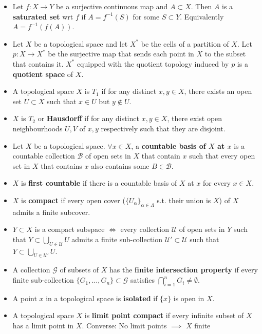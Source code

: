 \documentclass[frenchspacing,9pt,landscape,a4paper]{article}
\theoremstyle{remark}
\begin{document}
\begin{multicols}{4}
\begin{itemize}
\item Let $f:X\to Y$ be a surjective continuous map and  $A\subset X$. Then  $A$ is a \textbf{saturated set}
    wrt  $f$ if  $A=f^{-1}(S)$ for some  $S\subset Y$. Equivalently  $A=f^{-1}(f(A))$.
\item Let $X$ be a topological space and let  $X^*$ be the cells of a partition of  $X$. Let  $p:X\to X^*$ be
    the surjective map that sends each point in  $X$ to the subset that contains it.  $X^*$ equipped
    with the quotient topology induced by  $p$ is a \textbf{quotient space} of $X$.
    \item A topological space $X$ is  $T_1$ if for any distinct $x,y\in X$, there exists an open set  $U\subset X$ such
             that  $x\in U$ but  $y\notin U$.
         \item  $X$ is  $T_2$ or \textbf{Hausdorff} if for any distinct $x,y\in X$, there exist open
             neighbourhoods  $U,V$ of  $x,y$ respectively such that they are disjoint.
         \item  Let $X$ be a topological space. $\forall x\in X$, a \textbf{countable basis of $X$ at  $x$} is a countable collection
             $\mathcal{B}$ of open sets in  $X$ that contain  $x$ such that every open set in  $X$ that
             contains  $x$ also contains some  $B\in\mathcal{B}$.
         \item  $X$ is \textbf{first countable} if there is a countable basis of  $X$ at  $x$ for every
             $x\in X$.
         \item $X$ is \textbf{compact} if every open cover ($\{U_\alpha\}_{\alpha\in\Lambda}$ s.t. their
             union is  $X$) of  $X$ admits a finite subcover.
         \item $Y\subset X$ is a compact subspace  $\iff$ every collection  $\mathcal{U}$ of open sets in  $Y$ such
    that $Y\subset\bigcup_{U\in\mathcal{U}} U$ admits a finite sub-collection
    $\mathcal{U}'\subset\mathcal{U}$ such that  $Y\subset\bigcup_{U\in\mathcal{U}'}U$.
\item A collection $\mathcal{G}$ of subsets of  $X$ has the \textbf{finite intersection property} if every
    finite sub-collection  $\{G_1,\dots,G_n\}\subset\mathcal{G}$ satisfies $\bigcap_{i=1}^n
    G_i\neq\emptyset$.   
\item A point $x$ in a topological space is \textbf{isolated} if $\{x\}$ is open in  $X$.
\item A topological space $X$ is \textbf{limit point compact} if every infinite subset of  $X$ has a limit
    point in  $X$. Converse: No limit points $\implies$ $X$ finite 

\end{itemize}
\end{multicols}
\end{document}
